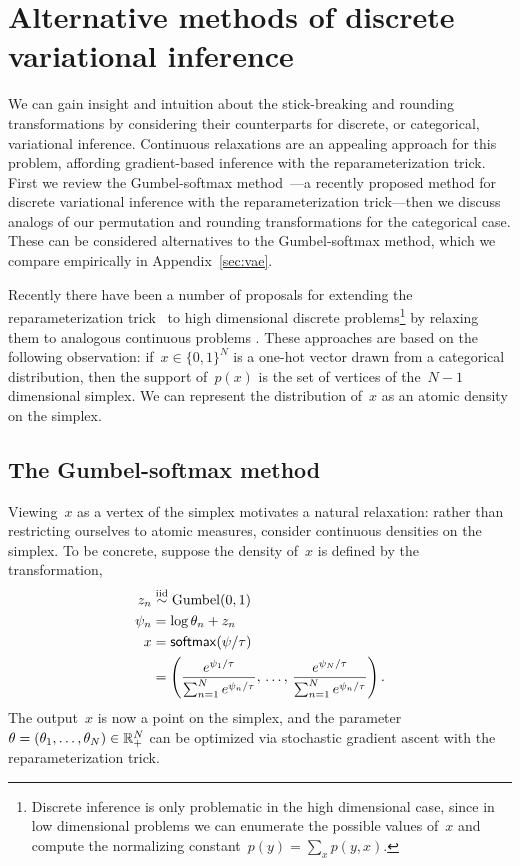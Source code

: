 \section{Alternative methods of discrete variational inference}

We can gain insight and intuition about the stick-breaking and
rounding transformations by considering their counterparts for
discrete, or categorical, variational inference.  Continuous
relaxations are an appealing approach for this problem, affording
gradient-based inference with the reparameterization trick.
First we review the Gumbel-softmax method~\citep{maddison2016concrete,
  jang2016categorical, kusner2016gans}---a recently proposed
method for discrete variational inference with the reparameterization
trick---then we discuss analogs of our permutation and rounding
transformations for the categorical case.  These can be considered
alternatives to the Gumbel-softmax method, which we compare
empirically in Appendix~\ref{sec:vae}.

Recently there have been a number of proposals for extending the
reparameterization trick~\citep{rezende2014stochastic, Kingma2014} to
high dimensional discrete problems\footnote{Discrete inference is only
  problematic in the high dimensional case, since in low dimensional
  problems we can enumerate the possible values of~$x$ and compute the
  normalizing constant~$p(y) = \sum_x p(y, x)$.} by relaxing them to
analogous continuous problems \citep{maddison2016concrete,
  jang2016categorical, kusner2016gans}.  These approaches are based on
the following observation: if~$x \in \{0,1\}^N$ is a one-hot vector
drawn from a categorical distribution, then the support of~$p(x)$ is
the set of vertices of the~$N-1$ dimensional simplex.  We can
represent the distribution of~$x$ as an atomic density on the simplex.

\subsection{The Gumbel-softmax method}
Viewing~$x$ as a vertex of the simplex motivates a natural relaxation:
rather than restricting ourselves to atomic measures,
consider continuous densities on the simplex. To be concrete, suppose
the density of~$x$ is defined by the transformation,
\begin{align*}
  z_n &\stackrel{\text{iid}}{\sim} \mathrm{Gumbel}(0, 1) \\
  \psi_n & = \log \theta_n + z_n  \\
  x &=  \mathsf{softmax}(\psi / \tau) \\
        &=\left(\frac{e^{\psi_1 / \tau}}{\sum_{n=1}^N e^{\psi_n / \tau}},
      \,\ldots,\,
      \frac{e^{\psi_N / \tau}}{\sum_{n=1}^N e^{\psi_n / \tau}} \right).
\end{align*}
The output~$x$ is now a point on the simplex, and the
parameter~${\theta = (\theta_1, \ldots, \theta_N) \in \mathbb{R}^N_+}$ can be optimized
via stochastic gradient ascent with the reparameterization trick.

